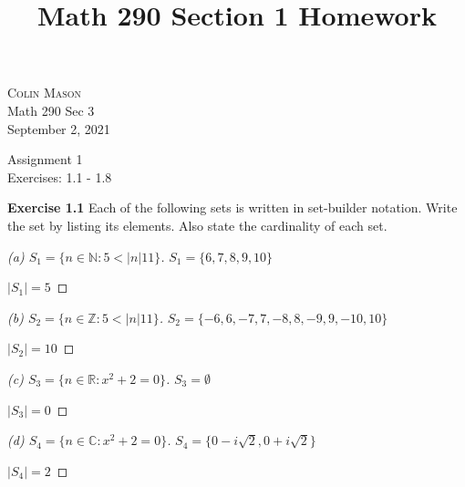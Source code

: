 \documentclass[12pt,oneside]{article}
\newenvironment{exercise}[1]{\vspace{.1in}\noindent\textbf{Exercise #1 \hspace{.05em}}}{}
\newcommand{\R}{\mathbb{R}}
\newcommand{\C}{\mathbb{C}}
\newcommand{\Z}{\mathbb{Z}}
\newcommand{\N}{\mathbb{N}}
\begin{document}
\title{Math 290 Section 1 Homework}

\begin{flushright}
\textsc{Colin Mason}  \\
Math 290 Sec 3\\
September 2, 2021
\end{flushright}

\begin{center}
\textsf{Assignment 1} \\
\textsf{Exercises: 1.1 - 1.8}
\end{center}


\begin{exercise}{1.1}
 Each of the following sets is written in set-builder notation. Write the
set by listing its elements. Also state the cardinality of each set.


\end{exercise}

\begin{proof}[(a) $S_1 = \{n \in \N : 5 < |n| 11\}$]

\item$S_1 = \{6, 7, 8, 9, 10 \}$
\item$|S_1| = 5$

\end{proof}

\begin{proof}[(b) $S_2 = \{n \in \Z : 5 < |n| 11\}$]

\item$S_2 = \{-6, 6, -7, 7, -8, 8,-9, 9,-10, 10 \}$
\item$|S_2| = 10$

\end{proof}

\begin{proof}[(c) $S_3 = \{n \in \R : x^2 +2 = 0\}$]

\item$S_3 = \emptyset$
\item$|S_3| = 0$

\end{proof}

\begin{proof}[(d) $S_4 = \{n \in \C : x^2 +2 = 0\}$]

\item$S_4 = \{0-i\sqrt{2}, 0 + i\sqrt{2}\}$
\item$|S_4| = 2$

\end{proof}
\end{document}
